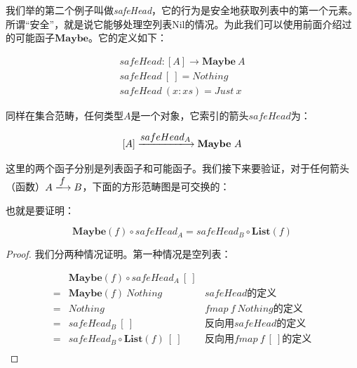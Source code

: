 \documentclass[b5paper]{ctexart}
\begin{document}
\begin{example}
我们举的第二个例子叫做\textit{safeHead}，它的行为是安全地获取列表中的第一个元素。所谓“安全”，就是说它能够处理空列表Nil的情况。为此我们可以使用前面介绍过的可能函子$\mathbf{Maybe}$。它的定义如下：

\[
\begin{array}{l}
safeHead : [A] \to \mathbf{Maybe}\ A \\
safeHead\ [\ ] = Nothing \\
safeHead\ (x:xs) = Just\ x
\end{array}
\]

同样在集合范畴，任何类型$A$是一个对象，它索引的箭头$safeHead$为：

\[
[A] \arrowto{safeHead_A} \mathbf{Maybe}\ A
\]

这里的两个函子分别是列表函子和可能函子。我们接下来要验证，对于任何箭头（函数）$A \arrowto{f} B$，下面的方形范畴图是可交换的：

\begin{center}
\end{center}

也就是要证明：

\[
  \mathbf{Maybe}(f) \circ safeHead_A = safeHead_B \circ \mathbf{List}(f)
\]

\begin{proof}
我们分两种情况证明。第一种情况是空列表：

\[
\begin{array}{cll}
  & \mathbf{Maybe}(f) \circ safeHead_A\ [\ ] & \\
= & \mathbf{Maybe}(f)\ Nothing & \text{$safeHead$的定义} \\
= & Nothing & \text{$fmap\ f\ Nothing$的定义} \\
= & safeHead_B\ [\ ] & \text{反向用$safeHead$的定义} \\
= & safeHead_B \circ \mathbf{List}(f)\ [\ ] & \text{反向用$fmap\ f\ [\ ]$的定义} \\
\end{array}
\]


\end{proof}
\end{example}
\end{document}
